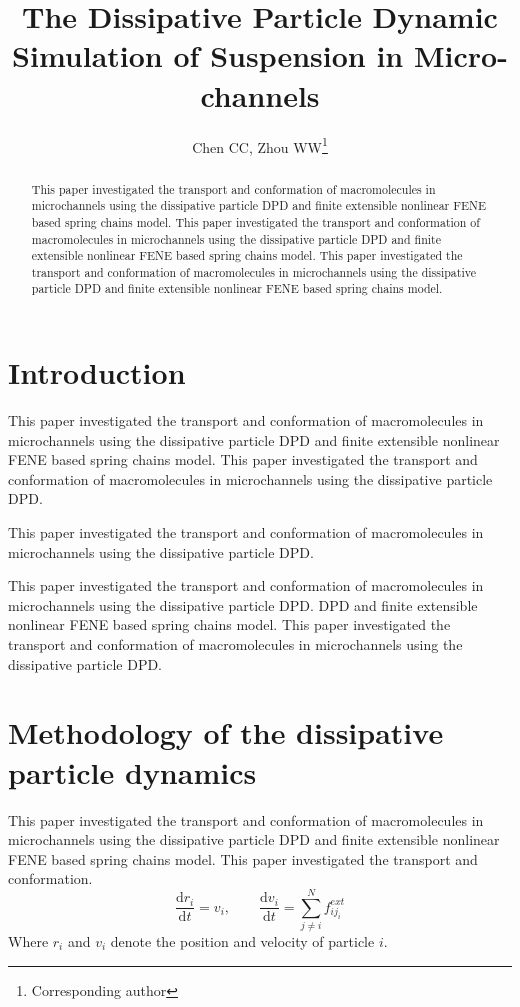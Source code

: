 \documentclass[12pt]{article}
\begin{document}
\title{The Dissipative Particle Dynamic Simulation of Suspension in Micro-channels}
\author{Chen CC, Zhou WW\footnote{Corresponding author}}
\maketitle

\begin{abstract}
This paper investigated the transport and conformation of macromolecules in microchannels using the dissipative particle DPD and finite extensible nonlinear FENE based spring chains model. This paper investigated the transport and conformation of macromolecules in microchannels using the dissipative particle DPD and finite extensible nonlinear FENE based spring chains model.  This paper investigated the transport and conformation of macromolecules in microchannels using the dissipative particle DPD and finite extensible nonlinear FENE based spring chains model.  
\end{abstract}

\section{Introduction}
This paper investigated the transport and conformation of macromolecules in microchannels using the dissipative particle DPD and finite extensible nonlinear FENE based spring chains model.  This paper investigated the transport and conformation of macromolecules in microchannels using the dissipative particle DPD\cite{Chun1999Fabrication,Fan2003Microchannel}.  

This paper investigated the transport and conformation of macromolecules in microchannels using the dissipative particle DPD.  

This paper investigated the transport and conformation of macromolecules in microchannels using the dissipative particle DPD.  DPD and finite extensible nonlinear FENE based spring chains model. This paper investigated the transport and conformation of macromolecules in microchannels using the dissipative particle DPD.

\section{Methodology of the dissipative particle dynamics}
This paper investigated the transport and conformation of macromolecules in microchannels using the dissipative particle DPD and finite extensible nonlinear FENE based spring chains model.  This paper investigated the transport and conformation.
\begin{equation}
\frac{\mathrm{d}r_i}{\mathrm{d}t}=v_i,\qquad
\frac{\mathrm{d}v_i}{\mathrm{d}t}=\sum_{j \neq i}^N {f_{{ij}_i}^{ext}}
\end{equation}
Where $r_i$ and $v_i$ denote the position and velocity of particle $i$.
\end{document}
